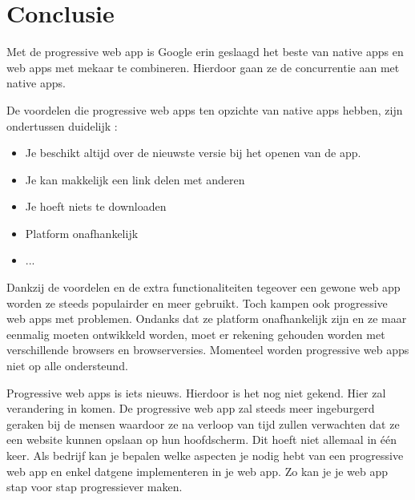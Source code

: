 
\chapter{Conclusie}
\label{ch:conclusie}

 
Met de progressive web app is Google erin geslaagd het beste van native apps en web apps met mekaar te combineren. Hierdoor gaan ze de concurrentie aan met native apps.

De voordelen die progressive web apps ten opzichte van native apps hebben, zijn ondertussen duidelijk :
\begin{itemize}
	\item Je beschikt altijd over de nieuwste versie bij het openen van de app.
	\item Je kan makkelijk een link delen met anderen
	\item Je hoeft niets te downloaden
	\item Platform onafhankelijk
	\item ...
\end{itemize}

 Dankzij de voordelen en de extra functionaliteiten tegeover een gewone web app worden ze steeds populairder en meer gebruikt. Toch kampen ook progressive web apps met problemen. Ondanks dat ze platform onafhankelijk zijn en ze maar eenmalig moeten ontwikkeld worden, moet er rekening gehouden worden met verschillende browsers en browserversies. Momenteel worden progressive web apps niet op alle ondersteund. 
 
 Progressive web apps is iets nieuws. Hierdoor is het nog niet gekend. Hier zal verandering in komen. De progressive web app zal steeds meer ingeburgerd geraken bij de mensen waardoor ze na verloop van tijd zullen verwachten dat ze een website kunnen opslaan op hun hoofdscherm. Dit hoeft niet allemaal in één keer. Als bedrijf kan je bepalen welke aspecten je nodig hebt van een progressive web app en enkel datgene implementeren in je web app. Zo kan je je web app stap voor stap progressiever maken. 
 
